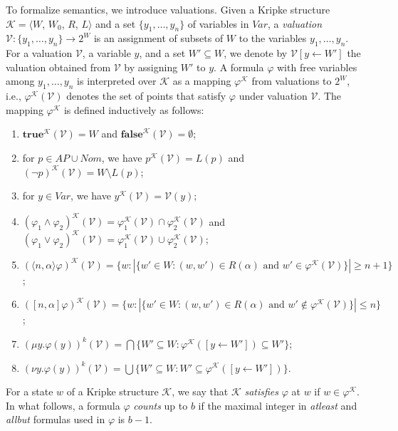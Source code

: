 \documentclass{LMCS}
\theoremstyle{plain}
\def \K             {\mathcal{K}}
\def \val           {\mathcal{V}}
\newcommand \tpl[1] {\langle #1 \rangle}
\begin{document}
To formalize semantics, we introduce valuations. Given a Kripke
structure $\K = \langle W$, $W_0$, $R$, $L \rangle$ and a set
$\{y_1,\ldots, y_n \}$ of variables in $\mathit{Var}$, a
\emph{valuation} $\val: \{y_1,\ldots,y_n \} \rightarrow 2^{W}$ is
an assignment of subsets of $W$ to the variables $y_1,\ldots,
y_n$.  For a valuation $\val$, a variable $y$, and a set $W'
\subseteq W$, we denote by $\val[y \leftarrow W']$ the valuation
obtained from $\val$ by assigning $W'$ to $y$. A formula $\varphi$
with free variables among $y_1, \ldots, y_n$ is interpreted over
$\K$ as a mapping $\varphi^{\K}$ from valuations to $2^{W}$, i.e.,
$\varphi^{\K}(\val)$ denotes the set of points that satisfy
$\varphi$ under valuation $\val$. The mapping $\varphi^{\K}$ is
defined inductively as follows:
\begin{enumerate}[$\bullet$]
\item
$\textbf{true}^{\K}(\val) = W$ and $\textbf{false}^{\K}(\val) =
\emptyset $;

\item
for $p \in AP \cup \mathit{Nom}$, we have $p^{\K}(\val) = L(p)$
and $(\neg p)^{\K}(\val) = W \setminus L(p)$;

\item
for $y \in \mathit{Var}$, we have $y^{\K}(\val) = \val(y)$;

\item
$(\varphi_1 \wedge \varphi_2)^{\K}(\val) = \varphi_1^{\K}(\val)
\cap \varphi_2^{\K}(\val)$ and $(\varphi_1 \vee
\varphi_2)^{\K}(\val) = \varphi_1^{\K}(\val) \cup
\varphi_2^{\K}(\val)$;

\item
$(\tpl{n,\alpha} \varphi)^{\K}(\val)= \{w : |\{w'\in W : (w,w')\in
R(\alpha) \text{ and } w' \in \varphi^{\K}(\val)\}|\geq n+1 \}$;

\item
$([n,\alpha] \varphi)^{\K}(\val)= \{w : |\{w'\in W : (w,w')\in
R(\alpha) \text{ and } w' \not \in \varphi^{\K}(\val)\}|\leq n
\}$;

\item
$(\mu y.\varphi(y))^{k}(\val)= \bigcap \{W'\subseteq W :
\varphi^{\K}([y \leftarrow W']) \subseteq W'\}$;

\item
$(\nu y.\varphi(y))^{k}(\val)= \bigcup \{W'\subseteq W : W'
\subseteq \varphi^{\K}([y \leftarrow W'])\}$.
\end{enumerate}

For a state $w$ of a Kripke structure $\K$, we say that $\K$ \emph{satisfies}
$\varphi$ at $w$ if $w \in \varphi^{\K}$. In what follows, a formula $\varphi$
\emph{counts} up to $b$ if the maximal integer in \emph{atleast} and
\emph{allbut} formulas used in $\varphi$ is $b-1$.
\end{document}
